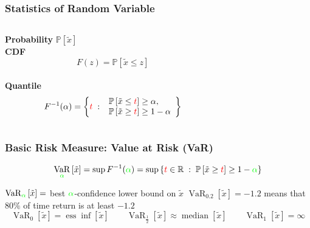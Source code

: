 \documentclass{beamer}
\newcommand{\tc}[2]{\textcolor{#1}{#2}}
\newcommand{\tcr}[1]{\tc{red}{#1}}
\newcommand{\tcg}[1]{\tc{green}{#1}}
\newcommand{\Real}{\mathbb{R}}
\DeclareMathOperator{\ess}{ess}
\DeclareMathOperator{\varo}{VaR}
\renewcommand{\P}[1]{\mathbb{P}\left[ #1 \right]}
\renewcommand{\Pr}[1]{\mathbb{P}\left[ #1 \right]}
\newcommand{\var}[2]{\varo_{#1} \left[#2\right]}
\begin{document}
\begin{frame} \frametitle{Statistics of Random Variable}
    \begin{columns}
      \begin{column}{0.5\linewidth}
        \textbf{Probability} 
        \( \P{\tilde{x}} \) \\[1.2cm]
        \textbf{CDF}
        \[
         F(z) = \P{\tilde{x} \le z} 
        \] \\[0.8cm]
        \textbf{Quantile}
        \[
          F^{-1}(\alpha) = \left\{ \tcr{t} \;:\;
            \begin{array}{l}
              \P{\tilde{x} \le \tcr{t}} \ge \alpha, \\
              \P{\tilde{x} \ge \tcr{t}} \ge 1-\alpha
            \end{array}
            \right\}
        \]
      \end{column}
      \begin{column}{0.5\linewidth}
        \centering
        \vfill 
        \vfill 
      \end{column}
    \end{columns}
\end{frame}
\begin{frame} \frametitle{Basic Risk Measure: Value at Risk (VaR)}
   \begin{equation*}
    \var{\tcg\alpha}{\tilde{x}}
    = \sup F^{-1}(\tcg\alpha)
    = \sup \left\{ \tcr{t} \in \Real \;:\; \Pr{\tilde{x} \ge \tcr{t}} \ge 1-\tcg\alpha \right\}
   \end{equation*}
   \begin{center}
   \end{center}
   \vfill
   $\var{\tcg{\alpha}}{ \tilde{x} } = $ best $\tcg{\alpha}$-confidence lower bound on  $\tilde{x}$
   \vfill 
   $\var{0.2}{\tilde{x}} = -1.2$ means that $80\%$ of time return is at least $-1.2$
   \vfill 
   \[
     \var{0}{\tilde{x}} = \ess \inf [\tilde{x}]
     \qquad 
     \var{\frac{1}{2}}{\tilde{x}} \approx \operatorname{median}[\tilde{x}]
     \qquad
     \var{1}{\tilde{x}} = \infty
   \]
 \end{frame}
\end{document}

